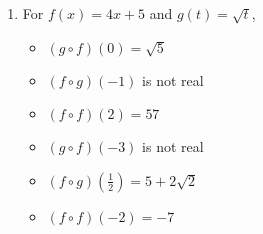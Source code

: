 \begin{enumerate}
\begin{multicols}{3}
\begin{itemize}
\item  $(f \circ f)(2) = 0$

\end{itemize}

\end{multicols}

\begin{multicols}{3}

\begin{itemize}

\item  $(g\circ f)(-3) = 11$

\item  $(f\circ g)\left(\frac{1}{2}\right) = \frac{23}{4}$

\item  $(f \circ f)(-2) = 2$

\end{itemize}

\end{multicols}

\item  For $f(x) = 4x+5$ and $g(t) = \sqrt{t}$,
\begin{multicols}{3}

\begin{itemize}

\item  $(g\circ f)(0) = \sqrt{5}$

\item  $(f\circ g)(-1)$ is not real

\item  $(f \circ f)(2) = 57$

\end{itemize}

\end{multicols}

\begin{multicols}{3}

\begin{itemize}

\item  $(g\circ f)(-3)$ is not real

\item  $(f\circ g)\left(\frac{1}{2}\right) = 5+2\sqrt{2}$

\item  $(f \circ f)(-2) = -7$

\end{itemize}

\end{multicols}


\end{enumerate}
